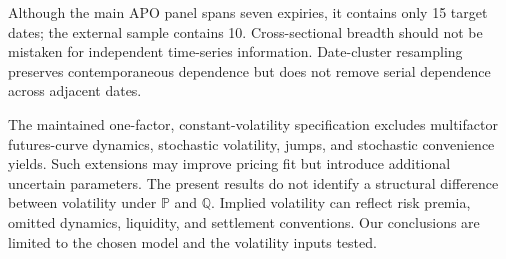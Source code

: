 Although the main APO panel spans seven expiries, it contains only 15 target dates; the external sample contains 10. Cross-sectional breadth should not be mistaken for independent time-series information. Date-cluster resampling preserves contemporaneous dependence but does not remove serial dependence across adjacent dates.

The maintained one-factor, constant-volatility specification excludes multifactor futures-curve dynamics, stochastic volatility, jumps, and stochastic convenience yields. Such extensions may improve pricing fit but introduce additional uncertain parameters. The present results do not identify a structural difference between volatility under \(\mathbb P\) and \(\mathbb Q\). Implied volatility can reflect risk premia, omitted dynamics, liquidity, and settlement conventions. Our conclusions are limited to the chosen model and the volatility inputs tested.
